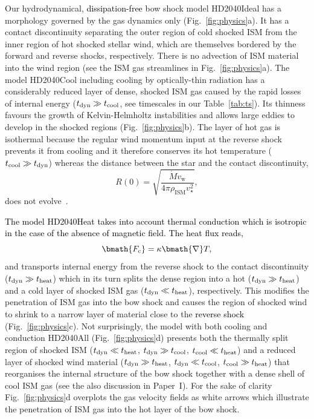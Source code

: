 \documentclass[useAMS,usenatbib]{mn2e}
\begin{document}
Our hydrodynamical, \textcolor{black}{dissipation-free} bow shock model HD2040Ideal has a morphology
governed by the gas dynamics only (Fig.~\ref{fig:physics}a). It has a contact
discontinuity separating the outer region of cold shocked ISM from the inner 
region of hot shocked stellar wind, which are themselves bordered by the forward and reverse shocks,
respectively. There is no advection of ISM material into the wind region (see
the ISM gas streamlines in Fig.~\ref{fig:physics}a). The model HD2040Cool including 
cooling by optically-thin radiation has a considerably reduced layer of dense, 
shocked ISM gas caused by the rapid losses of internal energy 
($t_{\rm dyn} \gg t_{\rm cool}$, see timescales in our 
Table~\ref{tab:ts}). Its thinness favours 
the growth of Kelvin-Helmholtz instabilities and allows large eddies
to develop in the shocked regions (Fig.~\ref{fig:physics}b). 
The layer of hot gas is isothermal because the regular wind 
momentum input at the reverse shock prevents it from cooling and 
it therefore conserves its hot temperature ($t_{\rm cool} \gg t_{\rm dyn}$) 
whereas the distance between the star and the contact discontinuity, 
%
\begin{equation}
	R(0) = \sqrt{ \frac{\dot{M}v_{\mathrm{w}}}{4\pi\rho_{\mathrm{ISM}}v_{\star}^{2} } },
\label{eq:Ro}
\end{equation}
%
does not evolve~\citep{wilkin_459_apj_1996}. 


\textcolor{black}{
The model HD2040Heat takes into account thermal conduction which is isotropic in the 
case of the absence of magnetic field. The heat flux reads,} 
%
\begin{equation}
     \bmath{{F}_{\rm c}} = \kappa \bmath{ \nabla } T, 
\label{eq:tciso}
\end{equation}
%
and transports internal energy from the reverse shock to the contact
discontinuity ($t_{\rm dyn} \gg t_{\rm heat}$) which in its turn splits 
the dense region into a hot ($t_{\rm dyn} \gg t_{\rm heat}$) and a cold layer of shocked ISM
gas ($t_{\rm dyn} \ll t_{\rm heat}$), respectively. 
This modifies the penetration of ISM gas into the bow shock and
causes the region of shocked wind to shrink to a narrow layer of material close to the
\textcolor{black}{reverse shock} (Fig.~\ref{fig:physics}c). Not surprisingly, the
model with both cooling and conduction HD2040All (Fig.~\ref{fig:physics}d)
presents both the thermally split region of shocked ISM ($t_{\rm dyn} \ll t_{\rm heat}$, $t_{\rm dyn} \gg t_{\rm cool}$, 
$t_{\rm cool} \ll t_{\rm heat}$) and a reduced layer
of shocked wind material ($t_{\rm dyn} \gg t_{\rm heat}$, 
$t_{\rm dyn} \ll t_{\rm cool}$, $t_{\rm cool} \gg t_{\rm heat}$) that reorganises the internal structure of the bow
shock together with a dense shell of cool ISM gas (see the also discussion in Paper~I).  
For the sake of clarity Fig.~\ref{fig:physics}d overplots the gas velocity fields as white arrows 
which illustrate the penetration of ISM gas into the hot layer of the bow shock. 
\end{document}
